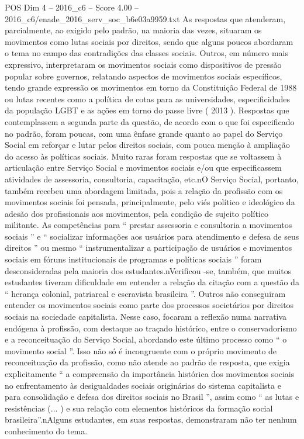 \begin{textsample}{POS Dim 4 – 2016\_c6 – Score 4.00 – 2016\_c6/enade\_2016\_serv\_soc\_b6e03a9959.txt}
As respostas que atenderam, parcialmente, ao exigido pelo padrão, na maioria das vezes, situaram os movimentos como lutas sociais por direitos, sendo que alguns poucos abordaram o tema no campo das contradições das classes sociais.
Outros, em número mais expressivo, interpretaram os movimentos sociais como dispositivos de pressão popular sobre governos, relatando aspectos de movimentos sociais específicos, tendo grande expressão os movimentos em torno da Constituição Federal de 1988 ou lutas recentes como a política de cotas para as universidades, especificidades da população LGBT e as ações em torno do passe livre ( 2013 ).
Respostas que contemplassem a segunda parte da questão, de acordo com o que foi especificado no padrão, foram poucas, com uma ênfase grande quanto ao papel do Serviço Social em reforçar e lutar pelos direitos sociais, com pouca menção à ampliação do acesso às políticas sociais.
Muito raras foram respostas que se voltassem à articulação entre Serviço Social e movimentos sociais e/ou que especificassem atividades de assessoria, consultoria, capacitação, etc.nO Serviço Social, portanto, também recebeu uma abordagem limitada, pois a relação da profissão com os movimentos sociais foi pensada, principalmente, pelo viés político e ideológico da adesão dos profissionais aos movimentos, pela condição de sujeito político militante.
As competências para “ prestar assessoria e consultoria a movimentos sociais ” e “ socializar informações aos usuários para atendimento e defesa de seus direitos ” ou mesmo “ instrumentalizar a participação de usuários e movimentos sociais em fóruns institucionais de programas e políticas sociais ” foram desconsideradas pela maioria dos estudantes.nVerificou -se, também, que muitos estudantes tiveram dificuldade em entender a relação da citação com a questão da “ herança colonial, patriarcal e escravista brasileira ”.
Outros não conseguiram entender os movimentos sociais como parte dos processos societários por direitos sociais na sociedade capitalista.
Nesse caso, focaram a reflexão numa narrativa endógena à profissão, com destaque ao traçado histórico, entre o conservadorismo e a reconceituação do Serviço Social, abordando este último processo como “ o movimento social ”.
Isso não só é incongruente com o próprio movimento de reconceituação da profissão, como não atende ao padrão de resposta, que exigia explicitamente “ a compreensão da importância histórica dos movimentos sociais no enfrentamento às desigualdades sociais originárias do sistema capitalista e para consolidação e defesa dos direitos sociais no Brasil ”, assim como “ as lutas e resistências (... ) e sua relação com elementos históricos da formação social brasileira”.nAlguns estudantes, em suas respostas, demonstraram não ter nenhum conhecimento do tema.

\end{textsample}
